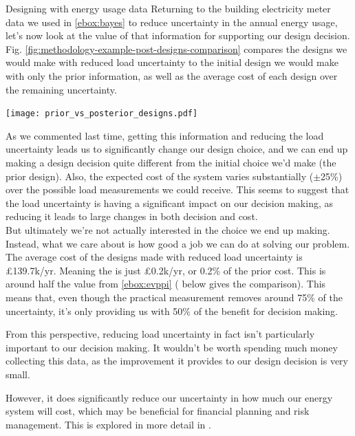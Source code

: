 \begin{ebox}[label=ebox:evii]{Designing with energy usage data}
    Returning to the building electricity meter data we used in \ref{ebox:bayes} to reduce uncertainty in the annual energy usage, let's now look at the value of that information for supporting our design decision. Fig. \ref{fig:methodology-example-post-designs-comparison} compares the designs we would make with reduced load uncertainty to the initial design we would make with only the prior information, as well as the average cost of each design over the remaining uncertainty.

    {
        \centering
        \texttt{[image: prior\_vs\_posterior\_designs.pdf]}
        \vspace*{-0.25cm}
        \label{fig:methodology-example-post-designs-comparison}
    }
    \bigskip

    As we commented last time, getting this information and reducing the load uncertainty leads us to significantly change our design choice, and we can end up making a design decision quite different from the initial choice we'd make (the prior design). Also, the expected cost of the system varies substantially ($\pm$25\%) over the possible load measurements we could receive. This seems to suggest that the load uncertainty is having a significant impact on our decision making, as reducing it leads to large changes in both decision and cost.\\

    But ultimately we're not actually interested in the choice we end up making. Instead, what we care about is how good a job we can do at solving our problem. The average cost of the designs made with reduced load uncertainty is £139.7k/yr. Meaning the  is just £0.2k/yr, or 0.2\% of the prior cost. This is around half the  value from \ref{ebox:evppi} ( below gives the comparison). This means that, even though the practical measurement removes around 75\% of the uncertainty, it's only providing us with 50\% of the benefit for decision making.

    From this perspective, reducing load uncertainty in fact isn't particularly important to our decision making. It wouldn't be worth spending much money collecting this data, as the improvement it provides to our design decision is very small.

    However, it does significantly reduce our uncertainty in how much our energy system will cost, which may be beneficial for financial planning and risk management. This is explored in more detail in .\\


\end{ebox}
